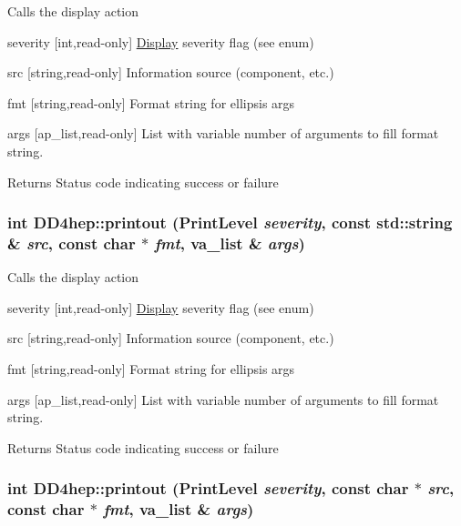 Calls the display action \begin{DoxyItemize}
\item severity \mbox{[}int,read-\/only\mbox{]} \hyperlink{class_d_d4hep_1_1_display}{Display} severity flag (see enum) \item src \mbox{[}string,read-\/only\mbox{]} Information source (component, etc.) \item fmt \mbox{[}string,read-\/only\mbox{]} Format string for ellipsis args \item args \mbox{[}ap\_\-list,read-\/only\mbox{]} List with variable number of arguments to fill format string. \begin{DoxyReturn}{Returns}
Status code indicating success or failure 
\end{DoxyReturn}
\end{DoxyItemize}
\hypertarget{namespace_d_d4hep_a3c8456e0ca02e7299e7bcd0480316eaa}{
\subsubsection[{printout}]{\setlength{\rightskip}{0pt plus 5cm}int DD4hep::printout (PrintLevel {\em severity}, \/  const std::string \& {\em src}, \/  const char $\ast$ {\em fmt}, \/  va\_\-list \& {\em args})}}
\label{namespace_d_d4hep_a3c8456e0ca02e7299e7bcd0480316eaa}
Calls the display action \begin{DoxyItemize}
\item severity \mbox{[}int,read-\/only\mbox{]} \hyperlink{class_d_d4hep_1_1_display}{Display} severity flag (see enum) \item src \mbox{[}string,read-\/only\mbox{]} Information source (component, etc.) \item fmt \mbox{[}string,read-\/only\mbox{]} Format string for ellipsis args \item args \mbox{[}ap\_\-list,read-\/only\mbox{]} List with variable number of arguments to fill format string. \begin{DoxyReturn}{Returns}
Status code indicating success or failure 
\end{DoxyReturn}
\end{DoxyItemize}
\hypertarget{namespace_d_d4hep_ad4be91cbf746f4c9fc6f175c371c14c3}{
\subsubsection[{printout}]{\setlength{\rightskip}{0pt plus 5cm}int DD4hep::printout (PrintLevel {\em severity}, \/  const char $\ast$ {\em src}, \/  const char $\ast$ {\em fmt}, \/  va\_\-list \& {\em args})}}
